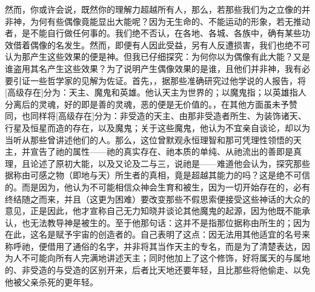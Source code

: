 然而，你或许会说，既然你的理解力超越所有人，那么，若那些我们为之立像的并非神，为何有些偶像竟能显出大能呢？因为无生命的、不能运动的形象，若无推动者，是不能自行做任何事的。我们绝不否认，在各地、各城、各族中，确有某些功效借着偶像的名发生。然而，即便有人因此受益，另有人反遭损害，我们也绝不可认为那产生这些效果的便是神。但我已仔细探究：为何你以为偶像有此大能？又是谁盗用其名产生这些效果？为了说明产生偶像效果的是谁，且他们并非神，我有必要引证一些哲学家的见解为佐证。首先，，据那些准确研究过他学说的人报告，将[高级存在]分为：天主、魔鬼和英雄。他认天主为世界的；以魔鬼指；以英雄指人分离后的灵魂，好的即是善的灵魂，恶的便是无价值的。，在其他方面虽未予赞同，也同样将[高级存在]分为：非受造的天主、由那非受造者所生、为装饰诸天、行星及恒星而造的存在，以及魔鬼；关于这些魔鬼，他认为不宜亲自谈论，却以为当听从那些曾讲述他们的人。那么，这位曾默观永恒理智和那可凭理性领悟的天主，并宣告了祂的属性——祂的真实存在、祂本质的单纯、从祂流出的善即是真理，且论述了原初大能，以及又论及二与三，说祂是——难道他会认为，探究那些据称由可感之物（即地与天）所生者的真相，竟是超越其能力的吗？这是绝不可信的。而是因为，他认为不可能相信众神会生育和被生，因为一切开始存在的，必有终结随之而来，并且（这更为困难）要改变那些不假思索便接受这些神话的大众的意见，正是因此，他才宣称自己无力知晓并谈论其他魔鬼的起源，因为他既不能承认，也无法教导神是被生的。至于他那句话：这并不是指那位据称由所生的；因为在此，这名是赋予宇宙的创造者的。自己表明了这点：因无法用其他适宜的名号来称呼祂，便借用了通俗的名字，并非将其当作天主的专名，而是为了清楚表达，因为人不可能向所有人完满地讲述天主；同时他加上了这个修饰，好将属天的与属地的、非受造的与受造的区别开来，后者比天地还要年轻，且比那些将他偷走、以免他被父亲杀死的更年轻。\par

